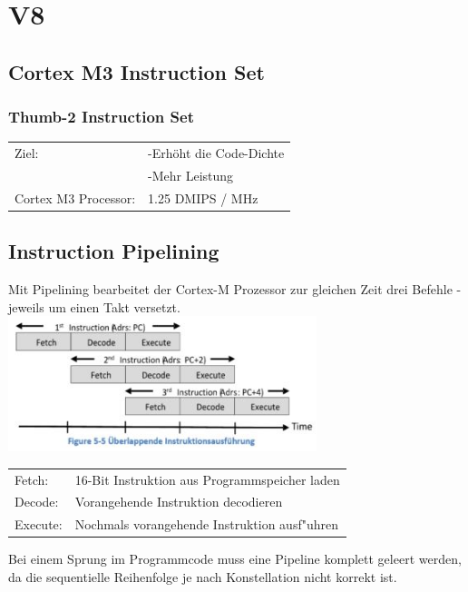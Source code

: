 \section{V8}
\begin{minipage}[t]{9cm}
	\subsection{Cortex M3 Instruction Set}
	\subsubsection{Thumb-2 Instruction Set}
    \begin{tabular}{l l}
        Ziel:&-Erhöht die Code-Dichte\\
            &  -Mehr Leistung\\ 
        Cortex M3 Processor:  & 1.25 DMIPS / MHz\\ 
    \end{tabular} 
    
\subsection{Instruction Pipelining}
                  Mit Pipelining bearbeitet der Cortex-M Prozessor zur gleichen Zeit drei Befehle - jeweils um einen Takt versetzt.\\
     \includegraphics[width=9cm]{images/pipelining}\\
     \begin{tabular}{m{1.5cm} m{6.5cm}}
        Fetch:& 16-Bit Instruktion aus Programmspeicher laden\\
        Decode:& Vorangehende Instruktion decodieren\\ 
        Execute:& Nochmals vorangehende Instruktion ausf"uhren\\
    \end{tabular} 
    Bei einem Sprung im Programmcode muss eine Pipeline komplett geleert werden, da die sequentielle Reihenfolge je nach Konstellation nicht korrekt ist.
\end{minipage}
%
\begin{minipage}[t]{0.5cm}
	\-\
\end{minipage}
